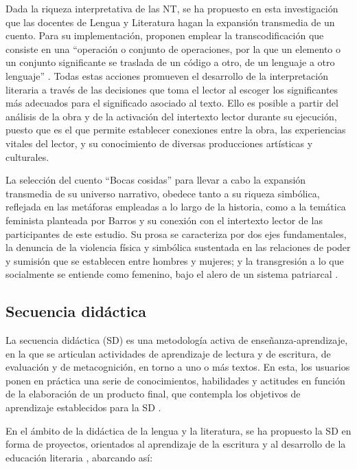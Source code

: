 \documentclass[spanish]{textolivre}
\begin{document}
Dada la riqueza interpretativa de las NT, se ha propuesto en esta investigación que las docentes de Lengua y Literatura hagan la expansión transmedia de un cuento. Para su implementación, \cite{ramos_estrategias_2008} proponen emplear la transcodificación que consiste en una “operación o conjunto de operaciones, por la que un elemento o un conjunto significante se traslada de un código a otro, de un lenguaje a otro lenguaje” \cite[p. 72]{mendoza_fillola_tu_1998}. Todas estas acciones promueven el desarrollo de la interpretación literaria a través de las decisiones que toma el lector al escoger los significantes más adecuados para el significado asociado al texto. Ello es posible a partir del análisis de la obra y de la activación del intertexto lector durante su ejecución, puesto que es el que permite establecer conexiones entre la obra, las experiencias vitales del lector, y su conocimiento de diversas producciones artísticas y culturales. 

La selección del cuento “Bocas cosidas” para llevar a cabo la expansión transmedia de su universo narrativo, obedece tanto a su riqueza simbólica, reflejada en las metáforas empleadas a lo largo de la historia, como a la temática feminista planteada por Barros y su conexión con el intertexto lector de las participantes de este estudio. Su prosa se caracteriza por dos ejes fundamentales, la denuncia de la violencia física y simbólica sustentada en las relaciones de poder y sumisión que se establecen entre hombres y mujeres; y la transgresión a lo que socialmente se entiende como femenino, bajo el alero de un sistema patriarcal \cite{asensio_erotismo_2016,moreno_ramos_artemisa_2014,lobos_martinez_pibarros:_2013}.


\subsection{Secuencia didáctica}\label{sec-formato}
La secuencia didáctica (SD) es una metodología activa de enseñanza-aprendizaje, en la que se articulan actividades de aprendizaje de lectura y de escritura, de evaluación y de metacognición, en torno a uno o más textos. En esta, los usuarios ponen en práctica una serie de conocimientos, habilidades y actitudes en función de la elaboración de un producto final, que contempla los objetivos de aprendizaje establecidos para la SD \cite{dolz_sexprimer_2001,camps_secuencias_2003,ramos_estrategias_2008,tobon_tobon_secuencias_2010,correro_educacion_2016}.

En el ámbito de la didáctica de la lengua y la literatura, se ha propuesto la SD en forma de proyectos, orientados al aprendizaje de la escritura y al desarrollo de la educación literaria \cite{camps_secuencias_2003,correro_educacion_2016}, abarcando así:
\end{document}
